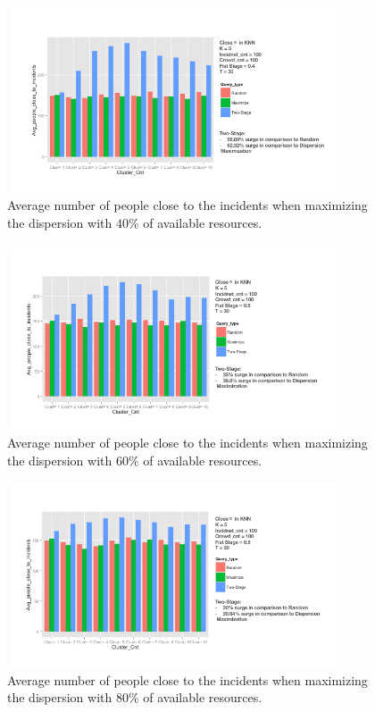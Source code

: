\documentclass{acm_proc_article-sp}
\begin{document}
\begin{figure}[!htb]
\centering
   \includegraphics[width=10cm ,height=5.5cm]{figuresPng/FirstStageFortyPerc}
   \caption{Average number of people close to the incidents when maximizing the dispersion with $40\%$ of available resources. }\label{fig: heatMap}
\end{figure}

\begin{figure}[!htb]
\centering
   \includegraphics[width=10cm ,height=5.5cm]{figuresPng/FirstStageSixtyPerc}
   \caption{Average number of people close to the incidents when maximizing the dispersion with $60\%$ of available resources. }\label{fig: heatMap}
\end{figure}


\begin{figure}[!htb]
\centering
   \includegraphics[width=10cm ,height=5.5cm]{figuresPng/FirstStageEightyPerc}
   \caption{Average number of people close to the incidents when maximizing the dispersion with $80\%$ of available resources. }\label{fig: heatMap}
\end{figure}
\end{document}
